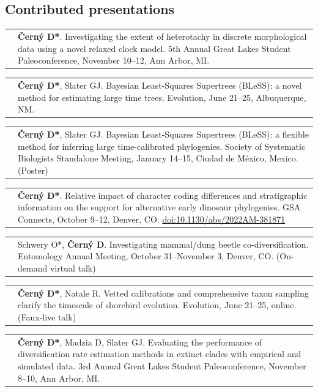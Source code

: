 \documentclass[10pt]{article}
\begin{document}
\subsection*{Contributed presentations}

\begin{tabularx}{\textwidth}{>{\raggedleft\arraybackslash}p{2.2cm} X}
2023 & \textbf{\v{C}ern\'{y} D*}. Investigating the extent of heterotachy in discrete morphological data using a novel relaxed clock model. 5th Annual Great Lakes Student Paleoconference, November 10--12, Ann Arbor, MI.
\end{tabularx}
\begin{tabularx}{\textwidth}{>{\raggedleft\arraybackslash}p{2.2cm} X}
2023 & \textbf{\v{C}ern\'{y} D*}, Slater GJ. Bayesian Least-Squares Supertrees (BLeSS): a novel method for estimating large time trees. Evolution, June 21--25, Albuquerque, NM.
\end{tabularx}
\begin{tabularx}{\textwidth}{>{\raggedleft\arraybackslash}p{2.2cm} X}
2023 & \textbf{\v{C}ern\'{y} D*}, Slater GJ. Bayesian Least-Squares Supertrees (BLeSS): a flexible method for inferring large time-calibrated phylogenies. Society of Systematic Biologists Standalone Meeting, January 14--15, Ciudad de M\'{e}xico, Mexico. (Poster)
\end{tabularx}
\begin{tabularx}{\textwidth}{>{\raggedleft\arraybackslash}p{2.2cm} X}
2022 & \textbf{\v{C}ern\'{y} D*}. Relative impact of character coding differences and stratigraphic information on the support for alternative early dinosaur phylogenies. GSA Connects, October 9--12, Denver, CO. \href{ https://doi.org/10.1130/abs/2022AM-381871}{doi:10.1130/abs/2022AM-381871}
\end{tabularx}
\begin{tabularx}{\textwidth}{>{\raggedleft\arraybackslash}p{2.2cm} X}
2021 & Schwery O*, \textbf{\v{C}ern\'{y} D}. Investigating mammal/dung beetle co-diversification. Entomology Annual Meeting, October 31--November 3, Denver, CO. (On-demand virtual talk)
\end{tabularx}
\begin{tabularx}{\textwidth}{>{\raggedleft\arraybackslash}p{2.2cm} X}
2021 & \textbf{\v{C}ern\'{y} D*}, Natale R. Vetted calibrations and comprehensive taxon sampling clarify the timescale of shorebird evolution. Evolution, June 21--25, online. (Faux-live talk)
\end{tabularx}
\begin{tabularx}{\textwidth}{>{\raggedleft\arraybackslash}p{2.2cm} X}
2019 & \textbf{\v{C}ern\'{y} D*}, Madzia D, Slater GJ. Evaluating the performance of diversification rate estimation methods in extinct clades with empirical and simulated data. 3rd Annual Great Lakes Student Paleoconference, November 8--10, Ann Arbor, MI.
\end{tabularx}
\end{document}
